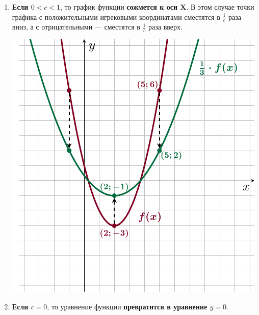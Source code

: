 \documentclass[10pt, a4paper]{article}
\begin{document}
\begin{enumerate}
\begin{enumerate}[label=\asbuk*)]
		\item
		\begin{minipage}[t]{0.65\textwidth}
			\textbf{Если \boldmath$0<c<1$}, то график функции \textbf{сожмется к оси $\boldsymbol X$}. В этом случае точки графика с положительными игрековыми координатами сместятся в $\frac{1}{c}$ раза вниз, а с отрицательными — сместятся в $\frac{1}{c}$ раза вверх.
		\end{minipage}
		\begin{minipage}[t]{0.25\textwidth}
			\begin{flushright}
				\includegraphics[align=t, width=\textwidth]{../graphs/graph_7/graph_7}
			\end{flushright}
		\end{minipage}
		\item
		\begin{minipage}[t]{0.65\textwidth}
			\textbf{Если \boldmath$c=0$}, то уравнение функции \textbf{превратится в уравнение \boldmath$y=0$}.\\
			

\end{minipage}
\end{enumerate}
\end{enumerate}
\end{document}
